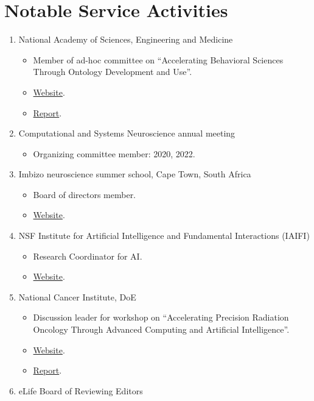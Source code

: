 \section*{Notable Service Activities}

  \begin{enumerate}
      \item National Academy of Sciences, Engineering and Medicine
          \begin{itemize}
             \item Member of ad-hoc committee on ``Accelerating Behavioral Sciences Through Ontology Development and Use''.
             \item \href{https://www.nationalacademies.org/our-work/accelerating-social-and-behavioral-science-through-ontology-development-and-use}{Website}.
             \item \href{https://nap.nationalacademies.org/catalog/26464/ontologies-in-the-behavioral-sciences-accelerating-research-and-the-spread?utm_source=All+DBASSE+Newsletters&utm_campaign=36883ad3ec-new-report-ontologies}{Report}.
          \end{itemize}

	  \item Computational and Systems Neuroscience annual meeting
	  	\begin{itemize}
	  		\item Organizing committee member: 2020, 2022.
	  	\end{itemize}
	  	
	  \item Imbizo neuroscience summer school, Cape Town, South Africa
	  	\begin{itemize}
	  		\item Board of directors member.
	  		\item \href{https://imbizo.africa/}{Website}.
	  	\end{itemize}	  
	  	
	  \item NSF Institute for Artificial Intelligence and Fundamental Interactions (IAIFI)
	  	\begin{itemize}
	  		\item Research Coordinator for AI.
	  		\item \href{https://iaifi.org/}{Website}.
	  	\end{itemize}	

      \item National Cancer Institute, DoE
          \begin{itemize}
             \item Discussion leader for workshop on ``Accelerating Precision Radiation Oncology Through Advanced Computing and Artificial Intelligence''.
 	          \item \href{https://events.cancer.gov/cbiit/radonc2021}{Website}.
             \item \href{https://meridian.allenpress.com/radiation-research/article/197/4/434/477175/Predictive-Radiation-Oncology-A-New-NCI-DOE}{Report}.
          \end{itemize}
          
       \item eLife Board of Reviewing Editors
         
	  		  	
  \end{enumerate}
  
  



